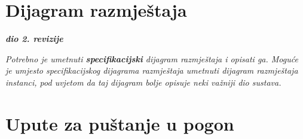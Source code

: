 			\eject 
			
			
			
		
		
		\section{Dijagram razmještaja}
			
			\textbf{\textit{dio 2. revizije}}
			
			 \textit{Potrebno je umetnuti \textbf{specifikacijski} dijagram razmještaja i opisati ga. Moguće je umjesto specifikacijskog dijagrama razmještaja umetnuti dijagram razmještaja instanci, pod uvjetom da taj dijagram bolje opisuje neki važniji dio sustava.}
			
			\eject 
		
		\section{Upute za puštanje u pogon}

